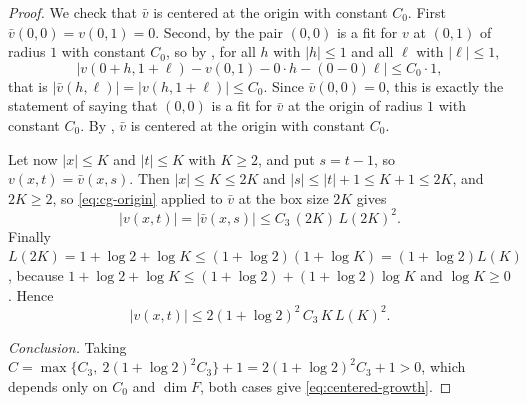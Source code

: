 \begin{proof}
We check that $\bar v$ is centered at the origin with constant $C_0$. First
$\bar v(0,0)=v(0,1)=0$. Second, by  the pair $(0,0)$ is a
fit for $v$ at $(0,1)$ of radius $1$ with constant $C_0$, so by
, for all $h$ with $|h|\le1$ and all $\ell$ with $|\ell|\le1$,
\[
  \bigl|v(0+h,1+\ell)-v(0,1)-0\cdot h-(0-0)\ell\bigr|\le C_0\cdot1,
\]
that is $|\bar v(h,\ell)|=|v(h,1+\ell)|\le C_0$. Since $\bar v(0,0)=0$, this is
exactly the statement of  saying that $(0,0)$ is a fit for
$\bar v$ at the origin of radius $1$ with constant $C_0$. By
, $\bar v$ is centered at the origin with constant $C_0$.

Let now $|x|\le K$ and $|t|\le K$ with $K\ge2$, and put $s=t-1$, so
$v(x,t)=\bar v(x,s)$. Then $|x|\le K\le2K$ and $|s|\le|t|+1\le K+1\le2K$, and
$2K\ge2$, so \eqref{eq:cg-origin} applied to $\bar v$ at the box size $2K$
gives
\[
  |v(x,t)|=|\bar v(x,s)|\le C_3\,(2K)\,L(2K)^2 .
\]
Finally $L(2K)=1+\log2+\log K\le(1+\log2)(1+\log K)=(1+\log2)L(K)$, because
$1+\log2+\log K\le(1+\log2)+(1+\log2)\log K$ and $\log K\ge0$. Hence
\[
  |v(x,t)|\le 2(1+\log2)^2\,C_3\,K\,L(K)^2 .
\]

\emph{Conclusion.} Taking
$C=\max\{C_3,\ 2(1+\log2)^2C_3\}+1=2(1+\log2)^2C_3+1>0$, which depends only on
$C_0$ and $\dim F$, both cases give
\eqref{eq:centered-growth}.
\end{proof}
